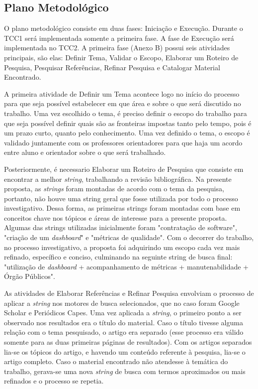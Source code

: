 \subsection{Plano Metodológico}
\label{plano_metodologico}
O plano metodológico consiste em duas fases: Iniciação e Execução. Durante o TCC1 será implementada somente a primeira fase. A fase de Execução será implementada no TCC2. A primeira fase (Anexo B) possui seis atividades principais, são elas: Definir Tema, Validar o Escopo, Elaborar um Roteiro de Pesquisa, Pesquisar Referências, Refinar Pesquisa e Catalogar Material Encontrado.

A primeira atividade de Definir um Tema acontece logo no início do processo para que seja possível estabelecer em que área e sobre o que será discutido no trabalho. Uma vez escolhido o tema, é preciso definir o escopo do trabalho para que seja possível definir quais são as fronteiras impostas tanto pelo tempo, pois é um prazo curto, quanto pelo conhecimento. Uma vez definido o tema, o escopo é validado juntamente com os professores orientadores para que haja um acordo entre aluno e orientador sobre o que será trabalhado.

Posteriormente, é necessario Elaborar um Roteiro de Pesquisa  que consiste em encontrar a melhor \textit{string}, trabalhando a revisão bibliográfica. Na presente proposta, as \textit{strings} foram montadas de acordo com o tema da pesquisa, portanto, não houve uma string geral que fosse utilizada por todo o processo investigativo. Dessa forma, as primeiras strings foram montadas com base em conceitos chave nos tópicos e áreas de interesse para a presente proposta. Algumas das strings utilizadas inicialmente foram "contratação de software", "criação de um \textit{dashboard}" e "métricas de qualidade". Com o decorrer do trabalho, no processo investigativo, a proposta foi adquirindo um escopo cada vez mais refinado, específico e conciso, culminando na seguinte string de busca final: "utilização de \textit{dashboard} + acompanhamento de métricas + manutenabilidade + Órgão Públicos". 

As atividades de Elaborar Referências e Refinar Pesquisa envolviam o processo de aplicar a \textit{string} nos motores de busca selecionados, que no caso foram Google Scholar e Periódicos Capes. Uma vez aplicada a \textit{string}, o primeiro ponto a ser observado nos resultados era o título do material. Caso o título tivesse alguma relação com o tema pesquisado, o artigo era separado (esse processo era válido somente para as duas primeiras páginas de resultados). Com os artigos separados lia-se os tópicos do artigo, e havendo um conteúdo referente à pesquisa, lia-se o artigo completo. Caso o  material encontrado não atendesse à temática do trabalho, gerava-se uma nova \textit{string} de busca com termos aproximados ou mais refinados e o processo se repetia.

